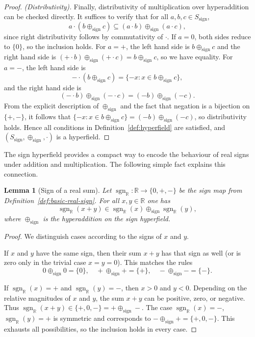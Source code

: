 \documentclass[11pt]{amsart}
\numberwithin{equation}{section}
\newtheorem{lemma}[theorem]{Lemma}
\theoremstyle{definition}
\theoremstyle{remark}
\newcommand{\R}{\mathbb{R}}
\begin{document}
\begin{proof}
\smallskip\noindent
\emph{(Distributivity).}  Finally, distributivity of multiplication
over hyperaddition can be checked directly.  It suffices to verify that
for all $a,b,c\in S_{\mathrm{sign}}$,
\[
  a\cdot(b\oplus_{\mathrm{sign}}c)
  \subseteq (a\cdot b)\oplus_{\mathrm{sign}}(a\cdot c),
\]
since right distributivity follows by commutativity of $\cdot$.  If
$a=0$, both sides reduce to $\{0\}$, so the inclusion holds.  For
$a=+$, the left hand side is $b\oplus_{\mathrm{sign}}c$ and the right
hand side is $(+\cdot b)\oplus_{\mathrm{sign}}(+\cdot c)
=b\oplus_{\mathrm{sign}}c$, so we have equality.  For $a=-$, the left
hand side is
\[
  -\cdot(b\oplus_{\mathrm{sign}}c)
  = \{-x : x\in b\oplus_{\mathrm{sign}}c\},
\]
and the right hand side is
\[
  (-\cdot b)\oplus_{\mathrm{sign}}(-\cdot c)
  = (-b)\oplus_{\mathrm{sign}}(-c).
\]
From the explicit description of $\oplus_{\mathrm{sign}}$ and the fact
that negation is a bijection on $\{+,-\}$, it follows that
$\{-x : x\in b\oplus_{\mathrm{sign}}c\}
= (-b)\oplus_{\mathrm{sign}}(-c)$, so distributivity holds.  Hence all
conditions in Definition~\ref{def:hyperfield} are satisfied, and
$(S_{\mathrm{sign}},\oplus_{\mathrm{sign}},\cdot)$ is a hyperfield.
\end{proof}

The sign hyperfield provides a compact way to encode the behaviour of
real signs under addition and multiplication.  The following simple
fact explains this connection.

\begin{lemma}[Sign of a real sum]\label{lem:sign-map}
Let $\operatorname{sgn}_\R:\R\to\{0,+,-\}$ be the sign map from
Definition~\ref{def:basic-real-sign}.  For all $x,y\in\R$ one has
\[
  \operatorname{sgn}_\R(x+y)
  \in \operatorname{sgn}_\R(x)\oplus_{\mathrm{sign}}\operatorname{sgn}_\R(y),
\]
where $\oplus_{\mathrm{sign}}$ is the hyperaddition on the sign
hyperfield.
\end{lemma}

\begin{proof}
We distinguish cases according to the signs of $x$ and $y$.

If $x$ and $y$ have the same sign, then their sum $x+y$ has that sign
as well (or is zero only in the trivial case $x=y=0$).  This matches
the rules
\[
  0\oplus_{\mathrm{sign}}0=\{0\},\quad
  +\oplus_{\mathrm{sign}}+=\{+\},\quad
  -\oplus_{\mathrm{sign}}-=\{-\}.
\]

If $\operatorname{sgn}_\R(x)=+$ and $\operatorname{sgn}_\R(y)=-$, then
$x>0$ and $y<0$.  Depending on the relative magnitudes of $x$ and $y$,
the sum $x+y$ can be positive, zero, or negative.  Thus
$\operatorname{sgn}_\R(x+y)\in\{+,0,-\}
=+\oplus_{\mathrm{sign}}-$.  The case
$\operatorname{sgn}_\R(x)=-$, $\operatorname{sgn}_\R(y)=+$ is
symmetric and corresponds to
$-\oplus_{\mathrm{sign}}+=\{+,0,-\}$.  This exhausts all possibilities,
so the inclusion holds in every case.
\end{proof}
\end{document}
